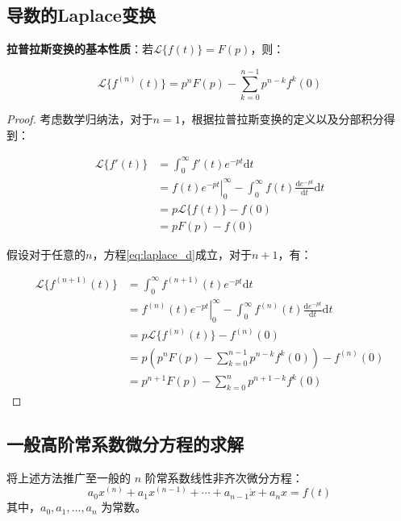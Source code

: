\documentclass[11pt,a4paper]{ctexart}
\newcommand{\dd}{\mathrm{d}}
\begin{document}
\subsection{导数的Laplace变换}

\textbf{拉普拉斯变换的基本性质}：若$\mathcal{L}\{f(t)\}=F(p)$，则：

\begin{equation}
    \mathcal{L}\{f^{(n)}(t)\}=p^nF(p)-\sum_{k=0}^{n-1}p^{n-k}f^{k}(0)
    \label{eq:laplace_d}
\end{equation}

\begin{proof}
    考虑数学归纳法，对于$n = 1$，根据拉普拉斯变换的定义以及分部积分得到：

    \begin{align*}
         \mathcal{L}\{f'(t)\}&=\int_{0}^{\infty}f'(t)e^{-pt}\dd t\\
         &=\left.f(t)e^{-pt}\right|_{0}^{\infty}-\int_{0}^{\infty}f(t)\frac{\dd e^{-pt}}{\dd t}\dd t\\
         &=p\mathcal{L}\{f(t)\}-f(0)\\
         &=pF(p)-f(0)
    \end{align*}

    假设对于任意的$n$，方程\eqref{eq:laplace_d}成立，对于$n+1$，有：

    \begin{align*}
        \mathcal{L}\{f^{(n+1)}(t)\}&=\int_{0}^{\infty}f^{(n+1)}(t)e^{-pt}\dd t\\
        &=\left.f^{(n)}(t)e^{-pt}\right|_{0}^{\infty}-\int_{0}^{\infty}f^{(n)}(t)\frac{\dd e^{-pt}}{\dd t}\dd t\\
        &=p\mathcal{L}\{f^{(n)}(t)\}-f^{(n)}(0)\\
        &=p\left(p^nF(p)-\sum_{k=0}^{n-1}p^{n-k}f^{k}(0)\right)-f^{(n)}(0)\\
        &=p^{n+1}F(p)-\sum_{k=0}^{n}p^{n+1-k}f^{k}(0)
    \end{align*}
\end{proof}

\subsection{一般高阶常系数微分方程的求解}

将上述方法推广至一般的 \(n\) 阶常系数线性非齐次微分方程：
\begin{equation}
    a_0 x^{(n)} + a_1 x^{(n-1)} + \cdots + a_{n-1} \dot{x} + a_n x = f(t)
    \label{eq:general_ode}
\end{equation}
其中，\(a_0, a_1, \dots, a_n\) 为常数。
\end{document}
